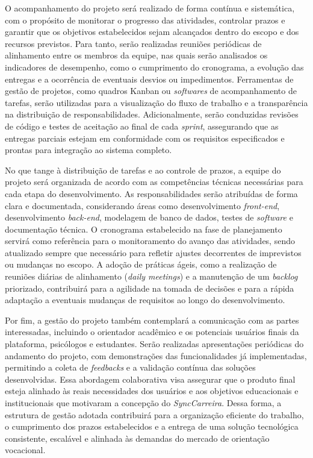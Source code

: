 O acompanhamento do projeto será realizado de forma contínua e sistemática, com o propósito de monitorar o progresso das atividades, controlar prazos e garantir que os objetivos estabelecidos sejam alcançados dentro do escopo e dos recursos previstos. Para tanto, serão realizadas reuniões periódicas de alinhamento entre os membros da equipe, nas quais serão analisados os indicadores de desempenho, como o cumprimento do cronograma, a evolução das entregas e a ocorrência de eventuais desvios ou impedimentos. Ferramentas de gestão de projetos, como quadros Kanban ou \textit{softwares} de acompanhamento de tarefas, serão utilizadas para a visualização do fluxo de trabalho e a transparência na distribuição de responsabilidades. Adicionalmente, serão conduzidas revisões de código e testes de aceitação ao final de cada \textit{sprint}, assegurando que as entregas parciais estejam em conformidade com os requisitos especificados e prontas para integração ao sistema completo.

No que tange à distribuição de tarefas e ao controle de prazos, a equipe do projeto será organizada de acordo com as competências técnicas necessárias para cada etapa do desenvolvimento. As responsabilidades serão atribuídas de forma clara e documentada, considerando áreas como desenvolvimento \textit{front-end}, desenvolvimento \textit{back-end}, modelagem de banco de dados, testes de \textit{software} e documentação técnica. O cronograma estabelecido na fase de planejamento servirá como referência para o monitoramento do avanço das atividades, sendo atualizado sempre que necessário para refletir ajustes decorrentes de imprevistos ou mudanças no escopo. A adoção de práticas ágeis, como a realização de reuniões diárias de alinhamento (\textit{daily meetings}) e a manutenção de um \textit{backlog} priorizado, contribuirá para a agilidade na tomada de decisões e para a rápida adaptação a eventuais mudanças de requisitos ao longo do desenvolvimento.

Por fim, a gestão do projeto também contemplará a comunicação com as partes interessadas, incluindo o orientador acadêmico e os potenciais usuários finais da plataforma, psicólogos e estudantes. Serão realizadas apresentações periódicas do andamento do projeto, com demonstrações das funcionalidades já implementadas, permitindo a coleta de \textit{feedbacks} e a validação contínua das soluções desenvolvidas. Essa abordagem colaborativa visa assegurar que o produto final esteja alinhado às reais necessidades dos usuários e aos objetivos educacionais e institucionais que motivaram a concepção do \textit{SyncCarreira}. Dessa forma, a estrutura de gestão adotada contribuirá para a organização eficiente do trabalho, o cumprimento dos prazos estabelecidos e a entrega de uma solução tecnológica consistente, escalável e alinhada às demandas do mercado de orientação vocacional.

